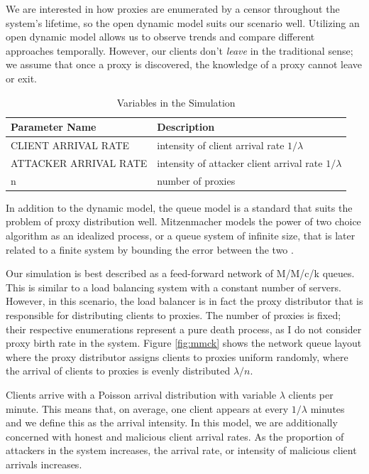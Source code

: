 We are interested in how proxies are enumerated by a censor throughout the system's lifetime, so the open dynamic model suits our scenario well. Utilizing an open dynamic model allows us to observe trends and compare different approaches temporally. However, our clients don't \textit{leave} in the traditional sense; we assume that once a proxy is discovered, the knowledge of a proxy cannot leave or exit. 

\begin{table}[h]
  \centering
	\begin{tabular}{ll}
	\hline
	\cline{1-2}
	Parameter Name   & Description  \\
	\hline
    CLIENT ARRIVAL RATE & intensity of client arrival rate $1/\lambda$ \\
	ATTACKER ARRIVAL RATE  & intensity of attacker client arrival rate $1/ \lambda$\\
	n     & number of proxies \\
	\hline
	\end{tabular}
  \caption{Variables in the Simulation}
  \label{tab:vars}
\end{table}

In addition to the dynamic model, the queue model is a standard that suits the problem of proxy distribution well. Mitzenmacher models the power of two choice algorithm as an idealized process, or a queue system of infinite size, that is later related to a finite system by bounding the error between the two \cite{mitzenmacher1996power}. 

Our simulation is best described as a feed-forward network of M/M/c/k queues. This is similar to a load balancing system with a constant number of servers. However, in this scenario, the load balancer is in fact the proxy distributor that is responsible for distributing clients to proxies. The number of proxies is fixed; their respective enumerations represent a pure death process, as I do not consider proxy birth rate in the system. Figure \ref{fig:mmck} shows the network queue layout where the proxy distributor assigns clients to proxies uniform randomly, where the arrival of clients to proxies is evenly distributed $\lambda/n$. 

Clients arrive with a Poisson arrival distribution with variable $\lambda$ clients per minute. This means that, on average, one client appears at every $1 / \lambda$ minutes and we define this as the arrival intensity. In this model, we are additionally concerned with honest and malicious client arrival rates. As the proportion of attackers in the system increases, the arrival rate, or intensity of malicious client arrivals increases.

